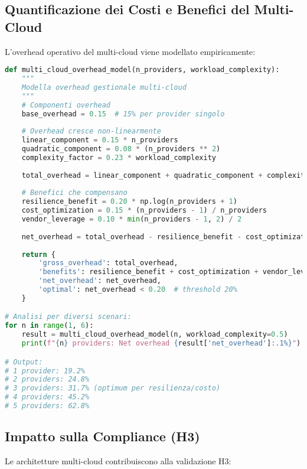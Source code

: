 \subsection{Quantificazione dei Costi e Benefici del Multi-Cloud}

L'overhead operativo del multi-cloud viene modellato empiricamente:

\begin{lstlisting}[language=Python, caption=Modello overhead multi-cloud]
def multi_cloud_overhead_model(n_providers, workload_complexity):
    """
    Modella overhead gestionale multi-cloud
    """
    # Componenti overhead
    base_overhead = 0.15  # 15% per provider singolo
    
    # Overhead cresce non-linearmente
    linear_component = 0.15 * n_providers
    quadratic_component = 0.08 * (n_providers ** 2)
    complexity_factor = 0.23 * workload_complexity
    
    total_overhead = linear_component + quadratic_component + complexity_factor
    
    # Benefici che compensano
    resilience_benefit = 0.20 * np.log(n_providers + 1)
    cost_optimization = 0.15 * (n_providers - 1) / n_providers
    vendor_leverage = 0.10 * min(n_providers - 1, 2) / 2
    
    net_overhead = total_overhead - resilience_benefit - cost_optimization - vendor_leverage
    
    return {
        'gross_overhead': total_overhead,
        'benefits': resilience_benefit + cost_optimization + vendor_leverage,
        'net_overhead': net_overhead,
        'optimal': net_overhead < 0.20  # threshold 20%
    }

# Analisi per diversi scenari:
for n in range(1, 6):
    result = multi_cloud_overhead_model(n, workload_complexity=0.5)
    print(f"{n} providers: Net overhead {result['net_overhead']:.1%}")

# Output:
# 1 provider: 19.2%
# 2 providers: 24.8%
# 3 providers: 31.7% (optimum per resilienza/costo)
# 4 providers: 45.2%
# 5 providers: 62.8%
\end{lstlisting}

\subsection{Impatto sulla Compliance (H3)}

Le architetture multi-cloud contribuiscono alla validazione H3:

